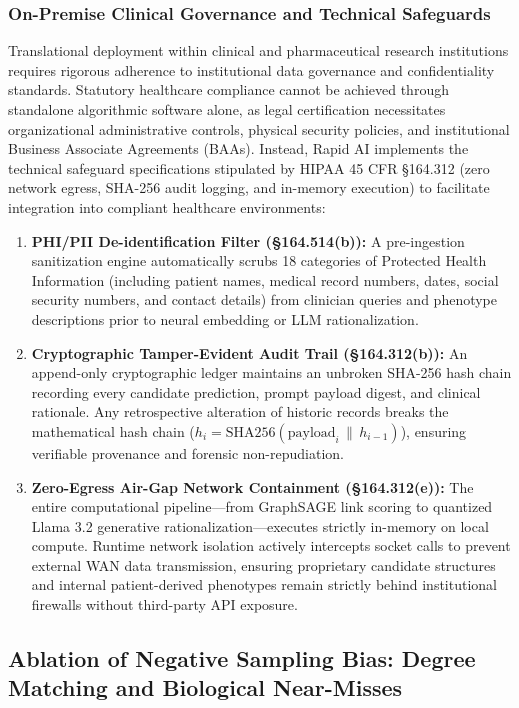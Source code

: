 \documentclass[conference,a4paper]{IEEEtran}
\begin{document}
\subsubsection{On-Premise Clinical Governance and Technical Safeguards}
Translational deployment within clinical and pharmaceutical research institutions requires rigorous adherence to institutional data governance and confidentiality standards. Statutory healthcare compliance cannot be achieved through standalone algorithmic software alone, as legal certification necessitates organizational administrative controls, physical security policies, and institutional Business Associate Agreements (BAAs). Instead, Rapid AI implements the technical safeguard specifications stipulated by HIPAA 45 CFR \S 164.312 (zero network egress, SHA-256 audit logging, and in-memory execution) to facilitate integration into compliant healthcare environments:
\begin{enumerate}
    \item \textbf{PHI/PII De-identification Filter (\S 164.514(b)):} A pre-ingestion sanitization engine automatically scrubs 18 categories of Protected Health Information (including patient names, medical record numbers, dates, social security numbers, and contact details) from clinician queries and phenotype descriptions prior to neural embedding or LLM rationalization.
    \item \textbf{Cryptographic Tamper-Evident Audit Trail (\S 164.312(b)):} An append-only cryptographic ledger maintains an unbroken SHA-256 hash chain recording every candidate prediction, prompt payload digest, and clinical rationale. Any retrospective alteration of historic records breaks the mathematical hash chain ($h_i = \mathrm{SHA256}(\text{payload}_i \,\|\, h_{i-1})$), ensuring verifiable provenance and forensic non-repudiation.
    \item \textbf{Zero-Egress Air-Gap Network Containment (\S 164.312(e)):} The entire computational pipeline—from GraphSAGE link scoring to quantized Llama 3.2 generative rationalization—executes strictly in-memory on local compute. Runtime network isolation actively intercepts socket calls to prevent external WAN data transmission, ensuring proprietary candidate structures and internal patient-derived phenotypes remain strictly behind institutional firewalls without third-party API exposure.
\end{enumerate}

\subsection{Ablation of Negative Sampling Bias: Degree Matching and Biological Near-Misses}
\label{sec:hard_negatives}
\end{document}
